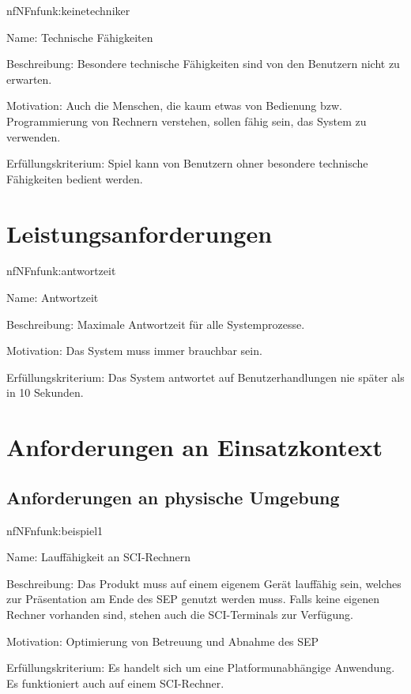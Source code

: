 \begin{description}[leftmargin=5em, style=sameline]	
	\begin{lhp}{nf}{NF}{nfunk:keinetechniker}
		\item [Name:] Technische Fähigkeiten
		\item [Beschreibung:] Besondere technische Fähigkeiten sind von den Benutzern nicht zu erwarten.
		\item [Motivation:] Auch die Menschen, die kaum etwas von Bedienung bzw. Programmierung von Rechnern verstehen, sollen fähig sein, das System zu verwenden.
		\item [Erfüllungskriterium:] Spiel kann von Benutzern ohner besondere technische Fähigkeiten bedient werden.
	\end{lhp}
\end{description}

\section{Leistungsanforderungen}

\begin{description}[leftmargin=5em, style=sameline]	
	\begin{lhp}{nf}{NF}{nfunk:antwortzeit}
		\item [Name:] Antwortzeit
		\item [Beschreibung:] Maximale Antwortzeit für alle Systemprozesse.
		\item [Motivation:] Das System muss immer brauchbar sein.
		\item [Erfüllungskriterium:] Das System antwortet auf Benutzerhandlungen nie später als in 10 Sekunden.
	\end{lhp}
\end{description}

\section{Anforderungen an Einsatzkontext}

\subsection{Anforderungen an physische Umgebung}

\begin{description}[leftmargin=5em, style=sameline]	
	\begin{lhp}{nf}{NF}{nfunk:beispiel1}
		\item [Name:] Lauffähigkeit an SCI-Rechnern
		\item [Beschreibung:] Das Produkt muss auf einem eigenem Gerät lauffähig sein, welches zur Präsentation am Ende des SEP genutzt werden muss. Falls keine eigenen Rechner vorhanden sind, stehen auch die SCI-Terminals zur Verfügung.
		\item [Motivation:] Optimierung von Betreuung und Abnahme des SEP
		\item [Erfüllungskriterium:] Es handelt sich um eine Platformunabhängige Anwendung. Es funktioniert auch auf einem SCI-Rechner.
	\end{lhp}
\end{description}


